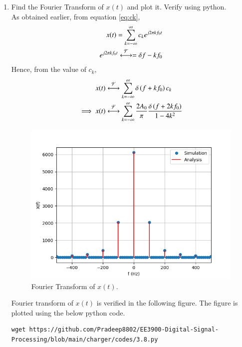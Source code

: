 \documentclass[journal,12pt,twocolumn]{IEEEtran}
\renewcommand\thesection{\arabic{section}}
\begin{document}
\begin{enumerate}[label=\thesection.\arabic*
	,ref=\thesection.\theenumi]
	\item Find the Fourier Transform of $x(t)$ and plot it. Verify using python.\\
	\solution As obtained earlier, from equation \eqref{eq:ck},
	\begin{align}
		x(t)=\sum_{k=-\infty}^{\infty}c_k e^{j2\pi k f_0 t}\\
		e^{j 2 \pi k f_0 t}\overset{\mathcal{F}}{ \longleftrightarrow}=\delta{f-kf_0}
	\end{align}
	Hence, from the value of $c_k$,
	\begin{align}
 x(t)&\overset{\mathcal{F}}{ \longleftrightarrow}\sum_{k=-\infty}^{\infty} \delta\left(f+kf_0\right) c_k\\
		\implies x(t)&\overset{\mathcal{F}}{ \longleftrightarrow}\sum_{k=-\infty}^{\infty} \frac{2A_0}{\pi} \frac{\delta\left(f+2kf_0\right)}{1-4k^2} 
	\end{align} 
	\begin{figure}[!ht]
				\includegraphics[width=\columnwidth]{figs/3.8.png}
				\caption{Fourier Transform of $x(t)$.}
				\label{fig:fourier-xt}
			\end{figure}
	Fourier transform of $x(t)$ is verified in the following figure. 
	The figure is plotted using the below python code.
	\begin{lstlisting}
wget https://github.com/Pradeep8802/EE3900-Digital-Signal-Processing/blob/main/charger/codes/3.8.py

\end{lstlisting}
\end{enumerate}
\end{document}
